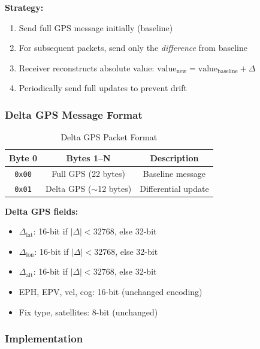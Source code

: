 \documentclass[11pt,a4paper]{article}
\begin{document}
\textbf{Strategy:}
\begin{enumerate}[noitemsep]
    \item Send full GPS message initially (baseline)
    \item For subsequent packets, send only the \emph{difference} from baseline
    \item Receiver reconstructs absolute value: $\text{value}_{\text{new}} = \text{value}_{\text{baseline}} + \Delta$
    \item Periodically send full updates to prevent drift
\end{enumerate}

\subsubsection{Delta GPS Message Format}

\begin{table}[H]
\centering
\begin{tabular}{|c|c|c|}
\hline
\textbf{Byte 0} & \textbf{Bytes 1--N} & \textbf{Description} \\
\hline
\texttt{0x00} & Full GPS (22 bytes) & Baseline message \\
\hline
\texttt{0x01} & Delta GPS ($\sim$12 bytes) & Differential update \\
\hline
\end{tabular}
\caption{Delta GPS Packet Format}
\end{table}

\textbf{Delta GPS fields:}
\begin{itemize}[noitemsep]
    \item $\Delta_{\text{lat}}$: 16-bit if $|\Delta| < 32768$, else 32-bit
    \item $\Delta_{\text{lon}}$: 16-bit if $|\Delta| < 32768$, else 32-bit
    \item $\Delta_{\text{alt}}$: 16-bit if $|\Delta| < 32768$, else 32-bit
    \item EPH, EPV, vel, cog: 16-bit (unchanged encoding)
    \item Fix type, satellites: 8-bit (unchanged)
\end{itemize}

\subsubsection{Implementation}
\end{document}
